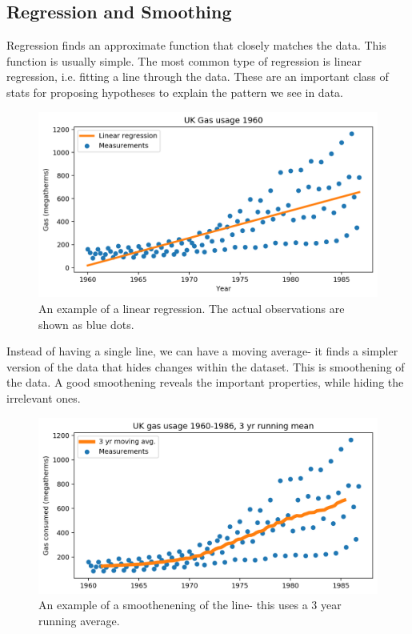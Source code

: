 \documentclass[a4paper, openany]{memoir}
\begin{document}
\subsection{Regression and Smoothing}
Regression finds an approximate function that closely matches the data. This function is usually simple. The most common type of regression is linear regression, i.e. fitting a line through the data. These are an important class of stats for proposing hypotheses to explain the pattern we see in data.
\begin{figure}[H]
    \centering
    \includegraphics[scale=0.5]{src/2.36 Gas Example Plot 20.png}
    \caption{An example of a linear regression. The actual observations are shown as blue dots.}
\end{figure}
Instead of having a single line, we can have a moving average- it finds a simpler version of the data that hides changes within the dataset. This is smoothening of the data. A good smoothening reveals the important properties, while hiding the irrelevant ones.
\begin{figure}[H]
    \centering
    \includegraphics[scale=0.5]{src/2.37 Gas Example Plot 21.png}
    \caption{An example of a smoothenening of the line- this uses a 3 year running average.}
\end{figure}
\newpage
\end{document}
